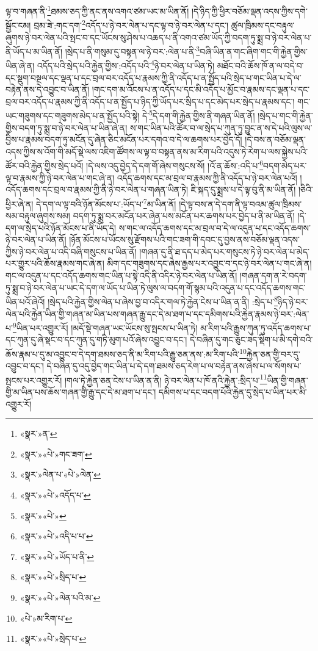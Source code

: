ལྟ་བ་གཞན་ནི་\footnote{«སྣར་»ན་}ཐམས་ཅད་ཀྱི་ནང་ནས་འགའ་ཙམ་ཡང་མ་ཡིན་ནོ། །དེ་ཉིད་ཀྱི་ཕྱིར་བཅོམ་ལྡན་འདས་ཀྱིས་དགེ་སྦྱོང་ངམ། བྲམ་ཟེ་:གང་དག་\footnote{«སྣར་»«པེ་»གང་ཟག་}འདོད་པ་ཉེ་བར་ལེན་པ་དང་ལྟ་བ་ཉེ་བར་ལེན་པ་དང་། ཚུལ་ཁྲིམས་དང་བརྟུལ་ཞུགས་ཉེ་བར་ལེན་པའི་སྤང་བ་དང་ཡོངས་སུ་ཤེས་པ་འཆད་པ་ནི་འགའ་ཙམ་ཡོད་ཀྱི་བདག་ཏུ་སྨྲ་བ་ཉེ་བར་ལེན་པ་ནི་ཡོད་པ་མ་ཡིན་ནོ། །སྲེད་པ་ནི་གསུམ་དུ་བསྟན་ལ་ཉེ་བར་:ལེན་པ་ནི་\footnote{«སྣར་»ལེན་པ་«པེ་»ལེན་}བཞི་ཡིན་ན་གང་ཞིག་གང་གི་རྐྱེན་གྱིས་ཡིན་ཞེ་ན། འདོད་པའི་སྲེད་པའི་རྐྱེན་གྱིས་:འདོད་པའི་\footnote{«སྣར་»«པེ་»འདོད་པ་}ཉེ་བར་ལེན་པ་ཡིན་ཏེ། མཐོང་བའི་ཆོས་ཁོ་ན་ལ་བདེ་བ་དང་སྡུག་བསྔལ་དང་ལྡན་པ་དང་བྲལ་བར་འདོད་པ་རྣམས་ཀྱི་ནི་འདོད་པ་ན་སྤྱོད་པའི་སྲེད་པ་གང་ཡིན་པ་དེ་ལ་བརྟེན་ནས་དེ་འབྱུང་བ་ཡིན་ནོ། །གང་དག་མ་འོངས་པ་ན་འདོད་པ་དང་མི་འདོད་པ་མྱོང་བ་རྣམས་དང་ལྡན་པ་དང་བྲལ་བར་འདོད་པ་རྣམས་ཀྱི་ནི་འདོད་པ་ན་སྤྱོད་པ་ཉིད་ཀྱི་ཡོད་པར་སྲིད་པ་དང་མེད་པར་སྲེད་པ་རྣམས་དང་། གང་ཡང་གཟུགས་དང་གཟུགས་མེད་པ་ན་སྤྱོད་པའི་སྟེ། དེ་\footnote{«སྣར་»«པེ་»}དེ་དག་གི་རྐྱེན་གྱིས་ནི་གཞན་ཡིན་ནོ། །སྲེད་པ་གང་གི་རྐྱེན་གྱིས་བདག་ཏུ་སྨྲ་བ་ཉེ་བར་ལེན་པ་ཡིན་ཞེ་ན། ས་གང་ཡིན་པའི་ཚོར་བ་ལ་སྲེད་པ་ཀུན་ཏུ་བྱུང་ན་ས་དེ་པའི་ལུས་ལ་བྱིས་པ་རྣམས་བདག་ཏུ་མངོན་དུ་ཞེན་ཅིང་མངོན་པར་དགའ་བ་དེ་ལ་ཆགས་པར་བྱེད་དོ། །དེ་བས་ན་བཅོམ་ལྡན་འདས་ཀྱིས་ས་འོག་གི་མདོ་སྡེ་ལས་འཇིག་ཚོགས་ལ་ལྟ་བ་བསྟན་ནས་མ་རིག་པའི་འདུས་ཏེ་རེག་པ་ལས་སྐྱེས་པའི་ཚོར་བའི་རྐྱེན་གྱིས་སྲེད་པའོ། །དེ་ལས་འདུ་བྱེད་དེ་དག་གོ་ཞེས་གསུངས་སོ། །འོ་ན་ཆོས་:འདི་པ་\footnote{«སྣར་»«པེ་»འདི་པ་པ་}བདག་མེད་པར་ལྟ་བ་རྣམས་ཀྱི་ཉེ་བར་ལེན་པ་གང་ཞེ་ན། འདོད་ཆགས་དང་མ་བྲལ་བ་རྣམས་ཀྱི་ནི་འདོད་པ་ཉེ་བར་ལེན་པའོ། །འདོད་ཆགས་དང་བྲལ་བ་རྣམས་ཀྱི་ནི་ཉེ་བར་ལེན་པ་གཞན་ཡིན་ཏེ། ཇི་སྐད་དུ་སྨྲས་པ་དེ་ལྟ་བུ་ནི་མ་ཡིན་ནོ། །ཅིའི་ཕྱིར་ཞེ་ན། དེ་དག་ལ་ལྟ་བའི་ཉོན་མོངས་པ་:ཡོད་པ་\footnote{«སྣར་»«པེ་»ཡོད་པ་ནི་}མ་ཡིན་ནོ། །དེ་ལྟ་བས་ན་དེ་དག་ནི་ལྟ་བའམ་ཚུལ་ཁྲིམས་སམ་བརྟུལ་ཞུགས་སམ། བདག་ཏུ་སྨྲ་བར་མངོན་པར་ཞེན་པས་མངོན་པར་ཆགས་པར་བྱེད་པ་ནི་མ་ཡིན་ནོ། །དེ་དག་ལ་སྲེད་པའི་ཉོན་མོངས་པ་ནི་ཡོད་དེ། ས་གང་ལ་འདོད་ཆགས་དང་མ་བྲལ་བ་དེ་ལ་འདུན་པ་དང་འདོད་ཆགས་ཉེ་བར་ལེན་པ་ཡིན་ནོ། །ཉོན་མོངས་པ་ཡོངས་སུ་རྫོགས་པའི་གང་ཟག་གི་དབང་དུ་བྱས་ནས་བཅོམ་ལྡན་འདས་ཀྱིས་ཉེ་བར་ལེན་པ་འདི་བཞི་གསུངས་པ་ཡིན་ནོ། །གཞན་དུ་ནི་ཐ་དད་པ་མེད་པར་གསུངས་ཏེ་ཉེ་བར་ལེན་པ་མེད་པར་གྱུར་པའི་ཆོས་རྣམས་གང་ཞེ་ན། མིག་དང་གཟུགས་དང་ཞེས་རྒྱས་པར་འབྱུང་བ་དང་ཉེ་བར་ལེན་པ་གང་ཞེ་ན། གང་ལ་འདུན་པ་དང་འདོད་ཆགས་གང་ཡིན་པ་སྟེ་འདི་ནི་འདིར་ཉེ་བར་ལེན་པ་ཡིན་ནོ། །གཞན་དག་ན་རེ་བདག་ཏུ་སྨྲ་བ་ཉེ་བར་ལེན་པ་ཡང་དེ་དག་ལ་ཡོད་པ་ཡིན་ཏེ་ལུས་ལ་བདག་གོ་སྙམ་པའི་འདུན་པ་དང་འདོད་ཆགས་གང་ཡིན་པའོ་ཞེའོ། །སྲེད་པའི་རྐྱེན་གྱིས་ལེན་པ་ཞེས་བྱ་བ་འདིར་གལ་ཏེ་རྐྱེན་ངེས་པ་ཡིན་ན་ནི། :སྲེད་པ་\footnote{«སྣར་»«པེ་»སྲིད་པ་}ཉིད་ཉེ་བར་ལེན་པའི་རྐྱེན་ཡིན་གྱི་གཞན་མ་ཡིན་པས་གཞན་རྒྱུ་དང་དེ་མ་ཐག་པ་དང་དམིགས་པའི་རྐྱེན་རྣམས་ཉེ་བར་:ལེན་པ་\footnote{«སྣར་»«པེ་»ལེན་པའི་མ་}ཡིན་པར་འགྱུར་རོ། །མདོ་སྡེ་གཞན་ཡང་ཡོངས་སུ་སྤངས་པ་ཡིན་ཏེ། མ་རིག་པའི་རྒྱུས་ཀུན་ཏུ་འདོད་ཆགས་པ་དང་ཀུན་དུ་ཞེ་སྡང་བ་དང་ཀུན་དུ་གཏི་མུག་པའོ་ཞེས་འབྱུང་བ་དང་། དེ་བཞིན་དུ་གང་ཅུང་ཟད་སྡིག་པ་མི་དགེ་བའི་ཆོས་རྣམ་པ་དུ་མ་འབྱུང་བ་དེ་དག་ཐམས་ཅད་ནི་མ་རིག་པའི་རྒྱུ་ཅན་ནས་:མ་རིག་པའི་\footnote{«པེ་»མ་རིག་པ་}རྐྱེན་ཅན་གྱི་བར་དུ་འབྱུང་བ་དང་། དེ་བཞིན་དུ་འདུ་བྱེད་གང་ཡིན་པ་དེ་དག་ཐམས་ཅད་རེག་པ་ལ་བརྟེན་ནས་ཞེས་པ་ལ་སོགས་པ་སྤངས་པར་འགྱུར་རོ། །གལ་ཏེ་རྐྱེན་ཅན་ངེས་པ་ཡིན་ན་ནི། ཉེ་བར་ལེན་པ་ཁོ་ནའི་རྐྱེན་:སྲིད་པ་\footnote{«སྣར་»«པེ་»སྲེད་པ་}ཡིན་གྱི་གཞན་གྱི་མ་ཡིན་པས་ཆོས་གཞན་གྱི་རྒྱུ་དང་དེ་མ་ཐག་པ་དང་། དམིགས་པ་དང་བདག་པོའི་རྐྱེན་དུ་སྲེད་པ་ཡིན་པར་མི་འགྱུར་རོ། 
